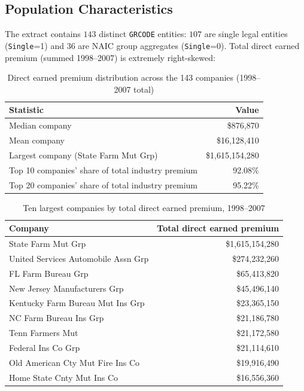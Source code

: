 \documentclass[11pt]{article}
\begin{document}
\subsection{Population Characteristics}
\label{sec:population}

The extract contains $143$ distinct \texttt{GRCODE} entities: $107$ are single legal entities
(\texttt{Single}=1) and $36$ are NAIC group aggregates (\texttt{Single}=0). Total direct earned
premium (summed 1998--2007) is extremely right-skewed:

\begin{table}[h]
\centering
\caption{Direct earned premium distribution across the 143 companies (1998--2007 total)}
\begin{tabular}{lr}
\toprule
Statistic & Value \\
\midrule
Median company & \$876{,}870 \\
Mean company & \$16{,}128{,}410 \\
Largest company (State Farm Mut Grp) & \$1{,}615{,}154{,}280 \\
Top 10 companies' share of total industry premium & 92.08\% \\
Top 20 companies' share of total industry premium & 95.22\% \\
\bottomrule
\end{tabular}
\end{table}

\begin{table}[h]
\centering
\caption{Ten largest companies by total direct earned premium, 1998--2007}
\begin{tabular}{lr}
\toprule
Company & Total direct earned premium \\
\midrule
State Farm Mut Grp & \$1{,}615{,}154{,}280 \\
United Services Automobile Assn Grp & \$274{,}232{,}260 \\
FL Farm Bureau Grp & \$65{,}413{,}820 \\
New Jersey Manufacturers Grp & \$45{,}496{,}140 \\
Kentucky Farm Bureau Mut Ins Grp & \$23{,}365{,}150 \\
NC Farm Bureau Ins Grp & \$21{,}186{,}780 \\
Tenn Farmers Mut & \$21{,}172{,}580 \\
Federal Ins Co Grp & \$21{,}114{,}610 \\
Old American Cty Mut Fire Ins Co & \$19{,}916{,}490 \\
Home State Cnty Mut Ins Co & \$16{,}556{,}360 \\
\bottomrule
\end{tabular}
\end{table}
\end{document}
